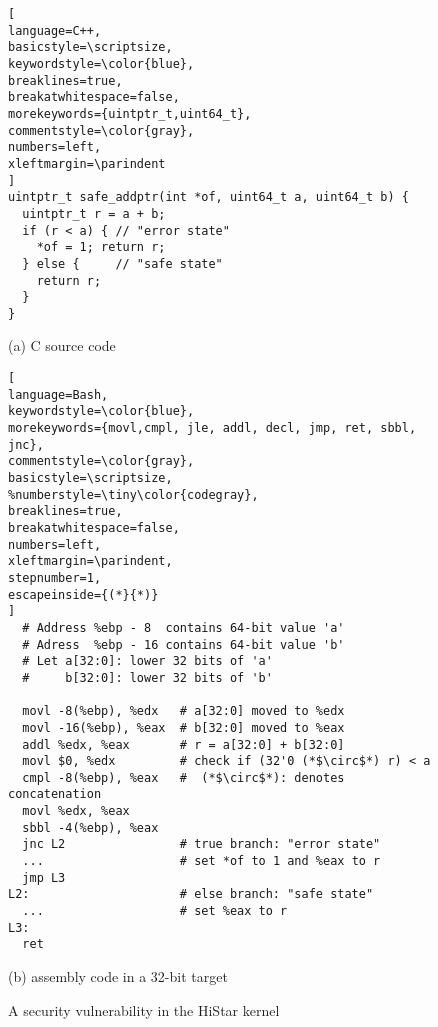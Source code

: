 \begin{figure}
\begin{lstlisting}[
language=C++,
basicstyle=\scriptsize,
keywordstyle=\color{blue},
breaklines=true,
breakatwhitespace=false,
morekeywords={uintptr_t,uint64_t},
commentstyle=\color{gray},
numbers=left,
xleftmargin=\parindent
]
uintptr_t safe_addptr(int *of, uint64_t a, uint64_t b) {
  uintptr_t r = a + b;
  if (r < a) { // "error state" 
    *of = 1; return r;
  } else {     // "safe state" 
    return r;
  }
}
\end{lstlisting}
\vspace{-10pt}
\begin{center}
{\small (a) C source code}
\end{center}
\begin{lstlisting}[
language=Bash,
keywordstyle=\color{blue},
morekeywords={movl,cmpl, jle, addl, decl, jmp, ret, sbbl, jnc},
commentstyle=\color{gray},
basicstyle=\scriptsize,
%numberstyle=\tiny\color{codegray},
breaklines=true,
breakatwhitespace=false,
numbers=left,
xleftmargin=\parindent,
stepnumber=1,
escapeinside={(*}{*)}
]
  # Address %ebp - 8  contains 64-bit value 'a'  
  # Adress  %ebp - 16 contains 64-bit value 'b'
  # Let a[32:0]: lower 32 bits of 'a' 
  #     b[32:0]: lower 32 bits of 'b'
  
  movl -8(%ebp), %edx   # a[32:0] moved to %edx
  movl -16(%ebp), %eax  # b[32:0] moved to %eax
  addl %edx, %eax       # r = a[32:0] + b[32:0]
  movl $0, %edx         # check if (32'0 (*$\circ$*) r) < a
  cmpl -8(%ebp), %eax   #  (*$\circ$*): denotes concatenation
  movl %edx, %eax
  sbbl -4(%ebp), %eax
  jnc L2                # true branch: "error state"
  ...                   # set *of to 1 and %eax to r
  jmp L3
L2:                     # else branch: "safe state"
  ...                   # set %eax to r
L3:
  ret
\end{lstlisting}
\vspace{-15pt}
\begin{center}
{\small (b) \ISA assembly code in a 32-bit target}
\end{center}
\caption{A security vulnerability in the HiStar kernel}
\label{fig:histar}
\end{figure}

